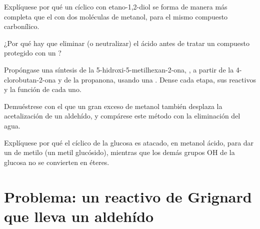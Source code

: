 \begin{exercise}[$\star\star$]\label{exo:b1:acetals-protection:8}
Explíquese por qué un  cíclico con etano-1,2-diol se forma de manera
más completa que el  con dos moléculas de metanol, para el mismo
compuesto carbonílico.
\end{exercise}

\begin{exercise}[$\star\star$]\label{exo:b1:acetals-protection:9}
¿Por qué hay que eliminar (o neutralizar) el  ácido antes de
tratar un compuesto protegido con un ?
\end{exercise}

\begin{exercise}[$\star\star\star$]\label{exo:b1:acetals-protection:10}
Propóngase una síntesis de la 5-hidroxi-5-metilhexan-2-ona,
, a partir de la 4-clorobutan-2-ona y de la
propanona, usando una . Dense cada etapa, sus reactivos y la
función de cada uno.
\end{exercise}

\begin{exercise}[$\star\star\star$]\label{exo:b1:acetals-protection:11}
Demuéstrese con el  que un gran exceso de metanol
también desplaza la acetalización de un aldehído, y compárese este
método con la eliminación del agua.
\end{exercise}

\begin{exercise}[$\star\star\star$]\label{exo:b1:acetals-protection:12}
Explíquese por qué el  cíclico de la glucosa es atacado, en
metanol ácido, para dar un  de metilo (un metil glucósido), mientras
que los demás grupos OH de la glucosa no se convierten en éteres.
\end{exercise}

\section{Problema: un reactivo de Grignard que lleva un aldehído}

